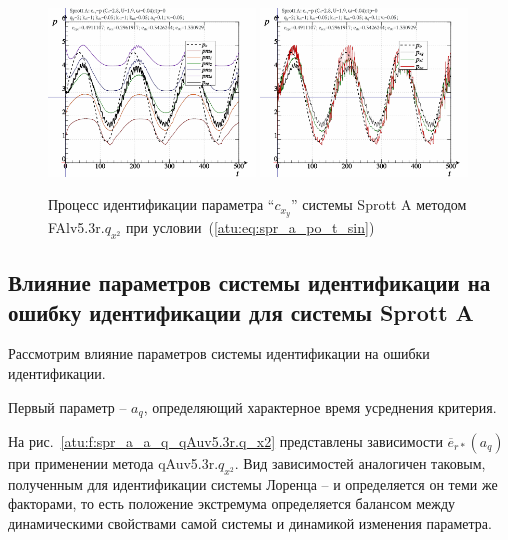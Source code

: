 \begin{figure}[h!]
  \centerline{
    \includegraphics[width=0.49\textwidth]{p/cha/spr_a/FAlv5.3A/sprott_a_FAlv5x3r-pl_n_sin.png}
    \hfill
    \includegraphics[width=0.49\textwidth]{p/cha/spr_a/FAlv5.3A/sprott_a_FAlv5x3r-p_p_sin.png}
  }
  \caption{Процесс идентификации параметра ``$c_{x_y}$'' системы Sprott A методом FAlv5.3r.$q_{x^2}$ при условии~(\ref{atu:eq:spr_a_po_t_sin})}
  \label{atu:f:spr_a_id_FAlv5.3r.q_x2_sin}
\end{figure}




\subsection{Влияние параметров системы идентификации на ошибку идентификации для системы Sprott A}  %


Рассмотрим влияние параметров системы идентификации на
ошибки идентификации.

Первый параметр --
$a_q$, определяющий характерное время усреднения критерия.

На рис.~\ref{atu:f:spr_a_a_q_qAuv5.3r.q_x2} представлены зависимости
$\overline{e}_{r*}(a_q)$ при применении метода qAuv5.3r.$q_{x^2}$.
Вид зависимостей аналогичен таковым, полученным для идентификации
системы Лоренца -- и определяется он теми же факторами,
то есть положение экстремума определяется балансом между
динамическими свойствами самой системы и динамикой
изменения параметра.


